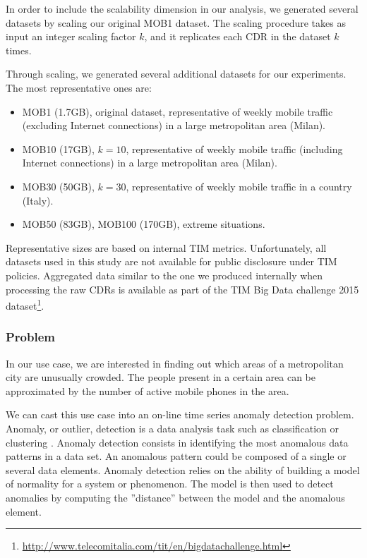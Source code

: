 {In order to include the scalability dimension in our analysis, we generated several datasets by scaling our original MOB1 dataset. The scaling procedure takes as input an integer scaling factor $k$, and it replicates each CDR in the dataset $k$ times.

Through scaling, we generated several additional datasets for our experiments. The most representative ones are:
\begin{itemize}
\item MOB1 (1.7GB), original dataset, representative of weekly mobile traffic (excluding Internet connections) in a large metropolitan area (Milan).
\item MOB10 (17GB), $k = 10$, representative of weekly mobile traffic (including Internet connections) in a large metropolitan area (Milan).
\item MOB30 (50GB), $k = 30$, representative of weekly mobile traffic in a country (Italy).
\item MOB50 (83GB), MOB100 (170GB), extreme situations.
\end{itemize}
Representative sizes are based on internal TIM metrics. Unfortunately, all datasets used in this study are not available for public disclosure under TIM policies. Aggregated data similar to the one we produced internally when processing the raw CDRs is available as part of the TIM Big Data challenge 2015 dataset\footnote{\url{http://www.telecomitalia.com/tit/en/bigdatachallenge.html}}.

\subsubsection{Problem}\label{sec:comp-mod-eval-cost-prob}
In our use case, we are interested in finding out which areas of a metropolitan city are unusually crowded. The people present in a certain area can be approximated by the number of active mobile phones in the area.

We can cast this use case into an on-line time series anomaly detection problem. Anomaly, or outlier, detection is a data analysis task such as classification or clustering \cite{aggarwal2015outlier}. Anomaly detection consists in identifying the most anomalous data patterns in a data set. An anomalous pattern could be composed of a single or several data elements. Anomaly detection relies on the ability of building a model of normality for a system or phenomenon. The model is then used to detect anomalies by computing the ''distance'' between the model and the anomalous element.

}

